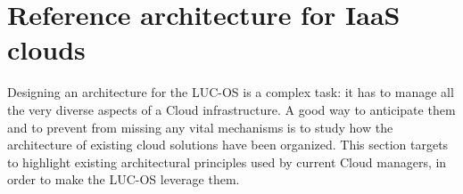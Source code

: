 \section{Reference architecture for IaaS clouds}
\label{sec:moreno}

Designing an architecture for the LUC-OS is a complex task: it has to manage all
the very diverse aspects of a Cloud infrastructure. A good way to anticipate 
them and to prevent from missing any vital mechanisms is to study how the 
architecture of existing cloud solutions have been organized. This section 
targets to highlight existing architectural principles used by current Cloud 
managers, in order to make the LUC-OS leverage them.




